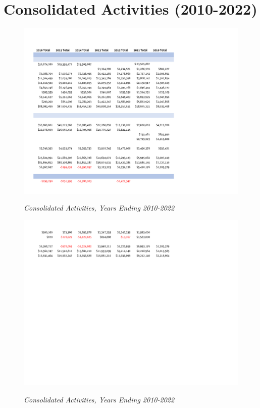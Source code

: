 
\chapter{Consolidated Activities (2010-2022)}\label{ch:consolidated_activities_2010-22}
\begin{figure}[hbt]
    \caption[Consolidated Activities, Years Ending 2010–2022]{\textit{Consolidated Activities, Years Ending 2010-2022}}\label{fig:consolidated_activities_2010-2022-3} %
    \includegraphics[width=\textwidth]{Consolidated Financial Statements/v5 Spreadsheets/Consolidated_Activities_Years_2010-2022 PDF pages/.pg_0003}\\ %
\end{figure}
\begin{figure}[hbt]
    \caption[Consolidated Activities, Years Ending 2010–2022]{\textit{Consolidated Activities, Years Ending 2010-2022}}\label{fig:consolidated_activities_2010-2022-4} %
    \includegraphics[width=\textwidth]{Consolidated Financial Statements/v5 Spreadsheets/Consolidated_Activities_Years_2010-2022 PDF pages/.pg_0004}\\ %
\end{figure}
